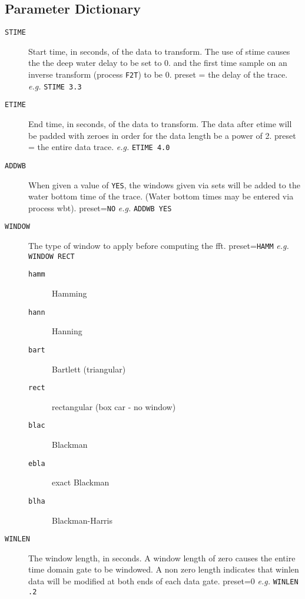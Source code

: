 \subsection{Parameter Dictionary}

\begin{description}
\item[\texttt{STIME}] Start time, in seconds, of the data to transform.  The use of
         stime causes the the deep water delay to be set to 0. and the
         first time sample on an inverse transform (process \texttt{F2T}) to be 0.
         \Gls{preset} = the delay of the trace.  \textit{e.g.}  \texttt{STIME 3.3}

\item[\texttt{ETIME}] End time, in seconds, of the data to transform.  The data after
         etime will be padded with zeroes in order for the data length be
         a power of 2.
         \Gls{preset} = the entire data trace.    \textit{e.g.}  \texttt{ETIME 4.0}

\item[\texttt{ADDWB}] When given a value of \texttt{YES}, the windows given via sets will
        be added to the water bottom time of the trace.
        (Water bottom times may be entered via process wbt).
        \Gls{preset}=\texttt{NO}     \textit{e.g.} \texttt{ADDWB YES}

\item[\texttt{WINDOW}] The type of window to apply before computing the \gls{fft}.
        \Gls{preset}=\texttt{HAMM}  \textit{e.g.} \texttt{WINDOW RECT}
\begin{description}
\item[\texttt{hamm}] Hamming
\item[\texttt{hann}] Hanning
\item[\texttt{bart}] Bartlett (triangular)
\item[\texttt{rect}] rectangular (box car - no window)
\item[\texttt{blac}] Blackman
\item[\texttt{ebla}] exact Blackman
\item[\texttt{blha}] Blackman-Harris
\end{description}

\item[\texttt{WINLEN}] The window length, in seconds.  A window length of zero causes
         the entire time domain gate to be windowed.  A non zero length
         indicates that winlen data will be modified at both ends of each
         data gate.
         \Gls{preset}=0  \textit{e.g.} \texttt{WINLEN .2}


\end{description}

